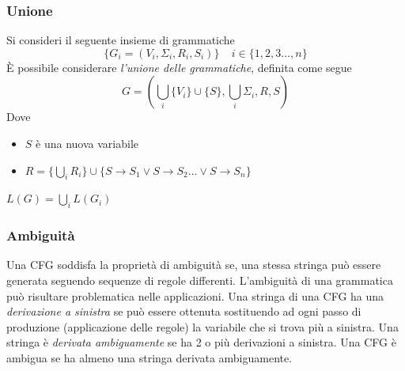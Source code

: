 \documentclass[10pt, letterpaper]{report}
\begin{document}
\subsubsection{Unione}
Si consideri il seguente insieme di grammatiche 
$$ \{G_i=(V_i,\Sigma_i,R_i,S_i)\}\ \ \ \ \ i\in\{1,2,3\dots,n\}$$
È possibile considerare \textit{l'unione delle grammatiche}, definita come segue
$$G=(\bigcup_i\{V_i\}\cup \{S\},\bigcup_i\Sigma_i,R,S) $$
Dove\begin{itemize}
    \item $S$ è una nuova variabile 
    \item $R=\{\bigcup_iR_i\}\cup\{S\rightarrow S_1\lor S\rightarrow S_2 \dots\lor S\rightarrow S_n\}$
\end{itemize}
\prop{} $L(G)=\bigcup_i L(G_i)$
\subsubsection{Ambiguità}
Una CFG soddisfa la proprietà di ambiguità se, una stessa stringa può essere generata seguendo 
sequenze di regole differenti. L'ambiguità di una grammatica può risultare problematica nelle applicazioni.\acc 
{} Una stringa di una CFG ha una \textit{derivazione a sinistra} se può essere ottenuta 
sostituendo ad ogni passo di produzione (applicazione delle regole) la variabile che si trova più a sinistra. Una 
stringa è \textit{derivata ambiguamente} se ha 2 o più derivazioni a sinistra. Una CFG è ambigua se ha almeno una 
stringa derivata ambiguamente. 
\end{document}
